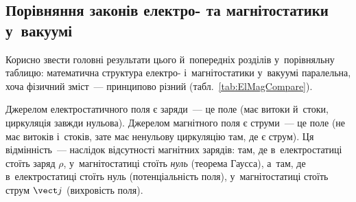 \subsection*{Порівняння законів електро- та магнітостатики у~вакуумі}


Корисно звести головні результати цього й~попередніх розділів у~порівняльну таблицю:
математична структура електро- і~магнітостатики у~вакуумі паралельна, хоча фізичний
зміст~--- принципово різний (табл.~\ref{tab:ElMagCompare}).

Джерелом електростатичного поля є заряди~--- це поле  (має витоки
й~стоки, циркуляція завжди нульова). Джерелом магнітного поля є струми~--- це поле
 (не має витоків і~стоків, зате має ненульову циркуляцію там, де є
струм). Ця відмінність~--- наслідок відсутності магнітних зарядів: там, де в~електростатиці
стоїть заряд $\rho$, у~магнітостатиці стоїть \emph{нуль} (теорема Гаусса), а~там, де
в~електростатиці стоїть нуль (потенціальність поля), у~магнітостатиці стоїть струм $\vect j$
(вихровість поля).


